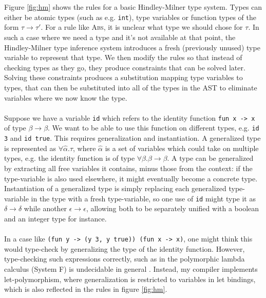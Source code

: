 \documentclass[12pt,twoside,notitlepage]{report}
\newcommand{\textinline}{\texttt}
\newcommand{\camlinline}{\texttt}
\begin{document}
\\\\
Figure \ref{fig:hm} shows the rules for a basic Hindley-Milner type system. Types can either be atomic types (such as e.g. \textinline{int}), type variables or function types of the form $\tau \rightarrow \tau'$. For a rule like \textsc{Abs}, it is unclear what type we should chose for $\tau$. In such a case where we need a type and it's not available at that point, the Hindley-Milner type inference system introduces a fresh (previously unused) type variable to represent that type. We then modify the rules so that instead of checking types as they go, they produce constraints that can be solved later. Solving these constraints produces a substitution mapping type variables to types, that can then be substituted into all of the types in the AST to eliminate variables where we now know the type.
\\\\
Suppose we have a variable \textinline{id} which refers to the identity function \camlinline{fun x -> x} of type $\beta \rightarrow \beta$. We want to be able to use this function on different types, e.g. \camlinline{id 3} and \camlinline{id true}. This requires generalization and instantiation. A generalized type is represented as $\forall \hat{\alpha}. \tau$, where $\hat{\alpha}$ is a set of variables which could take on multiple types, e.g. the identity function is of type $\forall \beta. \beta \rightarrow \beta$. A type can be generalized by extracting all free variables it contains, minus those from the context: if the type-variable is also used elsewhere, it might eventually become a concrete type. Instantiation of a generalized type is simply replacing each generalized type-variable in the type with a fresh type-variable, so one use of \camlinline{id} might type it as $\delta \rightarrow \delta$ while another $\epsilon \rightarrow \epsilon$, allowing both to be separately unified with a boolean and an integer type for instance.
\\\\
In a case like \camlinline{(fun y -> (y 3, y true)) (fun x -> x)}, one might think this would type-check by generalizing the type of the identity function. However, type-checking such expressions correctly, such as in the polymorphic lambda calculus (System F) is undecidable in general \cite{SystemFUndecidable}. Instead, my compiler implements let-polymorphism, where generalization is restricted to variables in let bindings, which is also reflected in the rules in figure \ref{fig:hm}.
\end{document}
